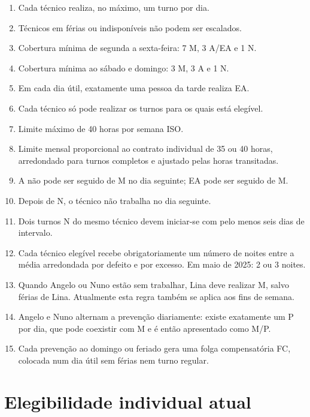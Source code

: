 \documentclass[10pt,a4paper]{article}
\begin{document}
\begin{enumerate}
    \item Cada técnico realiza, no máximo, um turno por dia.
    \item Técnicos em férias ou indisponíveis não podem ser escalados.
    \item Cobertura mínima de segunda a sexta-feira: 7 M, 3 A/EA e 1 N.
    \item Cobertura mínima ao sábado e domingo: 3 M, 3 A e 1 N.
    \item Em cada dia útil, exatamente uma pessoa da tarde realiza EA.
    \item Cada técnico só pode realizar os turnos para os quais está elegível.
    \item Limite máximo de 40 horas por semana ISO.
    \item Limite mensal proporcional ao contrato individual de 35 ou 40 horas,
          arredondado para turnos completos e ajustado pelas horas transitadas.
    \item A não pode ser seguido de M no dia seguinte; EA pode ser seguido de M.
    \item Depois de N, o técnico não trabalha no dia seguinte.
    \item Dois turnos N do mesmo técnico devem iniciar-se com pelo menos seis dias
          de intervalo.
    \item Cada técnico elegível recebe obrigatoriamente um número de noites entre
          a média arredondada por defeito e por excesso. Em maio de 2025: 2 ou 3 noites.
    \item Quando Angelo ou Nuno estão sem trabalhar, Lina deve realizar M, salvo
          férias de Lina. Atualmente esta regra também se aplica aos fins de semana.
    \item Angelo e Nuno alternam a prevenção diariamente: existe exatamente um P
          por dia, que pode coexistir com M e é então apresentado como M/P.
    \item Cada prevenção ao domingo ou feriado gera uma folga compensatória FC,
          colocada num dia útil sem férias nem turno regular.
\end{enumerate}

\section*{Elegibilidade individual atual}
\end{document}
